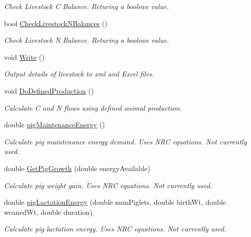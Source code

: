 \begin{DoxyCompactItemize}
\begin{DoxyCompactList}\small\item\em Check Livestock C Balance. Returing a boolean value. \end{DoxyCompactList}\item 
bool \mbox{\hyperlink{classlivestock_a75c6de36dbd59f4636092f88c8c19798}{Check\+Livestock\+N\+Balances}} ()
\begin{DoxyCompactList}\small\item\em Check Livestock N Balance. Returing a boolean value. \end{DoxyCompactList}\item 
\mbox{\label{classlivestock_a3f2eb801302c373964c9c4b665b15cf4}} 
void \mbox{\hyperlink{classlivestock_a3f2eb801302c373964c9c4b665b15cf4}{Write}} ()
\begin{DoxyCompactList}\small\item\em Output details of livestock to xml and Excel files. \end{DoxyCompactList}\item 
void \mbox{\hyperlink{classlivestock_ac40dff6a0a45d6a86ed5348166bd9074}{Do\+Defined\+Production}} ()
\begin{DoxyCompactList}\small\item\em Calculate C and N flows using defined animal production. \end{DoxyCompactList}\item 
double \mbox{\hyperlink{classlivestock_a030909d0ff24a1fcb0a88394033d2cc8}{pig\+Maintenance\+Energy}} ()
\begin{DoxyCompactList}\small\item\em Calculate pig maintenance energy demand. Uses N\+RC equations. Not currently used. \end{DoxyCompactList}\item 
double \mbox{\hyperlink{classlivestock_adffc58e33fd0d59a46ab0b49ce8c0c7b}{Get\+Pig\+Growth}} (double energy\+Available)
\begin{DoxyCompactList}\small\item\em Calculate pig weight gain. Uses N\+RC equations. Not currently used. \end{DoxyCompactList}\item 
double \mbox{\hyperlink{classlivestock_ace8fc768f943e96b99d42783932d53ee}{pig\+Lactation\+Energy}} (double num\+Piglets, double birth\+Wt, double weaned\+Wt, double duration)
\begin{DoxyCompactList}\small\item\em Calculate pig lactation energy. Uses N\+RC equations. Not currently used. \end{DoxyCompactList}\item 

\end{DoxyCompactItemize}
